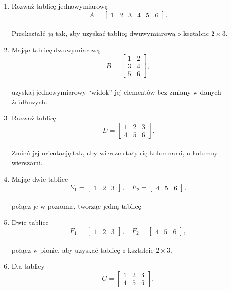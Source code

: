 \documentclass[
  letterpaper,
  DIV=11,
  numbers=noendperiod]{scrreprt}
\begin{document}
\begin{enumerate}
\def\labelenumi{\arabic{enumi}.}
\item
  Rozważ tablicę jednowymiarową\\
  \[A = \begin{bmatrix}1 & 2 & 3 & 4 & 5 & 6\end{bmatrix}.\]\\
  Przekształć ją tak, aby uzyskać tablicę dwuwymiarową o kształcie
  \(2 \times 3\).
\item
  Mając tablicę dwuwymiarową\\
  \[B = \begin{bmatrix}1 & 2 \\ 3 & 4 \\ 5 & 6\end{bmatrix},\]\\
  uzyskaj jednowymiarowy ``widok'' jej elementów bez zmiany w danych
  źródłowych.
\item
  Rozważ tablicę\\
  \[D = \begin{bmatrix}1 & 2 & 3 \\ 4 & 5 & 6\end{bmatrix}.\]\\
  Zmień jej orientację tak, aby wiersze stały się kolumnami, a kolumny
  wierszami.
\item
  Mając dwie tablice\\
  \[E_1 = \begin{bmatrix}1 & 2 & 3\end{bmatrix}, \quad E_2 = \begin{bmatrix}4 & 5 & 6\end{bmatrix},\]\\
  połącz je w poziomie, tworząc jedną tablicę.
\item
  Dwie tablice\\
  \[F_1 = \begin{bmatrix}1 & 2 & 3\end{bmatrix}, \quad F_2 = \begin{bmatrix}4 & 5 & 6\end{bmatrix},\]\\
  połącz w pionie, aby uzyskać tablicę o kształcie \(2 \times 3\).
\item
  Dla tablicy\\
  \[G = \begin{bmatrix}1 & 2 & 3 \\ 4 & 5 & 6\end{bmatrix},\]\\

\end{enumerate}
\end{document}
